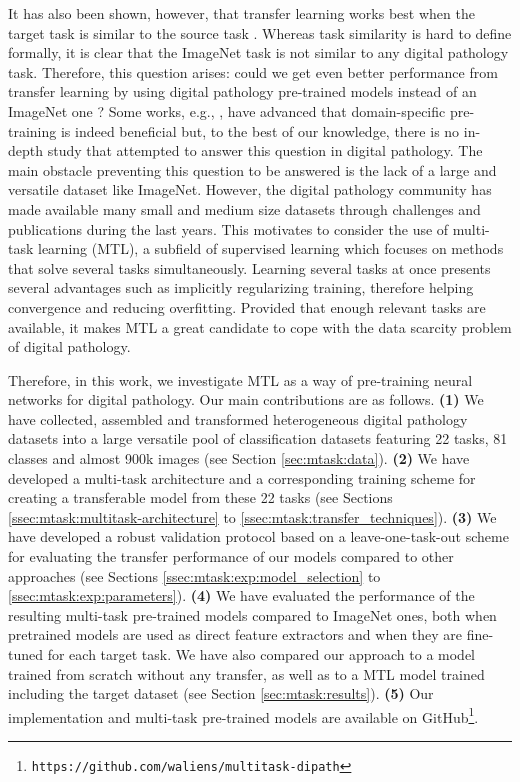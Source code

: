 It has also been shown, however, that transfer learning works best when the target task is similar to the source task \parencite{yosinski2014transferable}. Whereas task similarity is hard to define formally, it is clear that the ImageNet task is not similar to any digital pathology task. Therefore, this question arises: could we get even better performance from transfer learning by using digital pathology pre-trained models instead of an ImageNet one ? Some works, e.g., \parencite{khan2019improving, medela2019few, kraus2017automated, shang2019and}, have advanced that domain-specific pre-training is indeed beneficial but, to the best of our knowledge, there is no in-depth study that attempted to answer this question in digital pathology. The main obstacle preventing this question to be answered is the lack of a large and versatile dataset like ImageNet. However, the digital pathology community has made available many small and medium size datasets through challenges and publications during the last years. This motivates to consider the use of multi-task learning \parencite{zhang2017survey} (MTL), a subfield of supervised learning which focuses on methods that solve several tasks simultaneously. Learning several tasks at once presents several advantages such as implicitly regularizing training, therefore helping convergence and reducing overfitting. Provided that enough relevant tasks are available, it makes MTL a great candidate to cope with the data scarcity problem of digital pathology.

Therefore, in this work, we investigate MTL as a way of pre-training neural networks for digital pathology. Our main contributions are as follows. \textbf{(1)} We have collected, assembled and transformed heterogeneous digital pathology datasets into a large versatile pool of classification datasets featuring 22 tasks, 81 classes and almost 900k images (see Section \ref{sec:mtask:data}). \textbf{(2)} We have developed a multi-task architecture and a corresponding training scheme for creating a transferable model from these 22 tasks (see Sections \ref{ssec:mtask:multitask-architecture} to \ref{ssec:mtask:transfer_techniques}). \textbf{(3)} We have developed a robust validation protocol based on a leave-one-task-out scheme for evaluating the transfer performance of our models compared to other approaches (see Sections \ref{ssec:mtask:exp:model_selection} to \ref{ssec:mtask:exp:parameters}). \textbf{(4)} We have evaluated the performance of the resulting multi-task pre-trained models compared to ImageNet ones, both when pretrained models are used as direct feature extractors and when they are fine-tuned for each target task. We have also compared our approach to a model trained from scratch without any transfer, as well as to a MTL model trained including the target dataset (see Section \ref{sec:mtask:results}). \textbf{(5)} Our implementation and multi-task pre-trained models are available on GitHub\footnote{\texttt{https://github.com/waliens/multitask-dipath}}.

